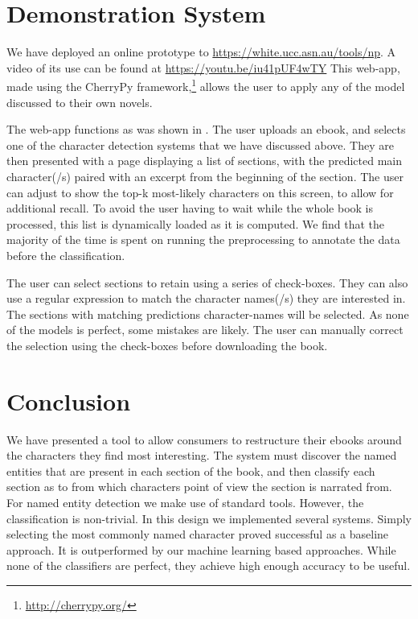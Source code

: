 \documentclass[11pt,a4paper]{article}
\begin{document}
\section{Demonstration System}\label{sec:demonstration}
We have deployed an online prototype to \url{https://white.ucc.asn.au/tools/np}.
A video of its use can be found at \url{https://youtu.be/iu41pUF4wTY}
This web-app, made using the CherryPy framework,\footnote{\url{http://cherrypy.org/}}
allows the user to apply any of the model discussed to their own novels.

The web-app functions as was shown in .
The user uploads an ebook, and selects one of the character detection systems that we have discussed above.
They are then presented with a page displaying a list of sections,
with the predicted main character(/s) paired with an excerpt from the beginning of the section.
The user can adjust to show the top-k most-likely characters on this screen, to allow for additional recall.
To avoid the user having to wait while the whole book is processed, this list is dynamically loaded as it is computed.
We find that the majority of the time is spent on running the preprocessing to annotate the data before the classification.

The user can select sections to retain using a series of check-boxes.
They can also use a regular expression to match the character names(/s) they are interested in.
The sections with matching predictions character-names will be selected.
As none of the models is perfect, some mistakes are likely.
The user can manually correct the selection using the check-boxes before downloading the book.



\section{Conclusion}\label{sec:conclusion}
We have presented a tool to allow consumers to restructure their ebooks around the characters they find most interesting.
The system must discover the named entities that are present in each section of the book,
and then classify each section as to from which characters point of view the section is narrated from.
For named entity detection we make use of standard tools.
However, the classification is non-trivial.
In this design we implemented several systems.
Simply selecting the most commonly named character proved successful as a baseline approach.
It is outperformed by our machine learning based  approaches.
While none of the classifiers are perfect,
they achieve high enough accuracy to be useful.
\end{document}
